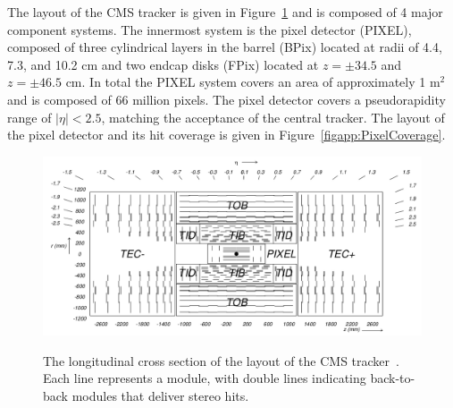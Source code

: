 The layout of the CMS tracker is given in Figure~\ref{figapp:TrackerLayout} and is composed of 4 major component systems.  The innermost system is the pixel detector (PIXEL), composed of three cylindrical layers in the barrel (BPix) located at radii of 4.4, 7.3, and 10.2 cm and two endcap disks (FPix) located at $z=\pm34.5$ and $z=\pm46.5$ cm.  In total the PIXEL system covers an area of approximately 1 $\text{m}^2$ and is composed of 66 million pixels.  The pixel detector covers a pseudorapidity range of $|\eta| < 2.5$, matching the acceptance of the central tracker.  The layout of the pixel detector and its hit coverage is given in Figure~\ref{figapp:PixelCoverage}.


\begin{figure}[!Hh]
       \centering
       \includegraphics[scale=0.4]{Figures/TrackerLayout.png} \\
       \caption[The longitudinal cross section of the layout of the CMS tracker.]{The longitudinal cross section of the layout of the CMS tracker~\cite{CMSdetector}.  Each line represents a module, with double lines indicating back-to-back modules that deliver stereo hits.}
\label{figapp:TrackerLayout}
\end{figure}



